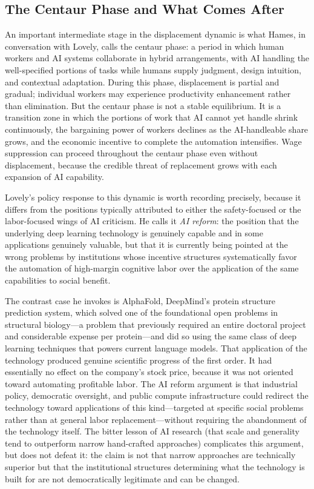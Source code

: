 \documentclass[12pt, a4paper]{article}
\theoremstyle{plain}
\theoremstyle{definition}
\theoremstyle{remark}
\begin{document}
\subsection{The Centaur Phase and What Comes After}

An important intermediate stage in the displacement dynamic is what Hames, in
conversation with Lovely, calls the centaur phase: a period in which human workers
and AI systems collaborate in hybrid arrangements, with AI handling the well-specified
portions of tasks while humans supply judgment, design intuition, and contextual
adaptation.
During this phase, displacement is partial and gradual; individual workers may
experience productivity enhancement rather than elimination.
But the centaur phase is not a stable equilibrium.
It is a transition zone in which the portions of work that AI cannot yet handle
shrink continuously, the bargaining power of workers declines as the AI-handleable
share grows, and the economic incentive to complete the automation intensifies.
Wage suppression can proceed throughout the centaur phase even without displacement,
because the credible threat of replacement grows with each expansion of AI capability.

Lovely's policy response to this dynamic is worth recording precisely, because it
differs from the positions typically attributed to either the safety-focused or the
labor-focused wings of AI criticism.
He calls it \emph{AI reform}: the position that the underlying deep learning
technology is genuinely capable and in some applications genuinely valuable, but
that it is currently being pointed at the wrong problems by institutions whose
incentive structures systematically favor the automation of high-margin cognitive
labor over the application of the same capabilities to social benefit.

The contrast case he invokes is AlphaFold, DeepMind's protein structure prediction
system, which solved one of the foundational open problems in structural biology---a
problem that previously required an entire doctoral project and considerable expense
per protein---and did so using the same class of deep learning techniques that powers
current language models.
That application of the technology produced genuine scientific progress of the first
order.
It had essentially no effect on the company's stock price, because it was not
oriented toward automating profitable labor.
The AI reform argument is that industrial policy, democratic oversight, and
public compute infrastructure could redirect the technology toward applications of
this kind---targeted at specific social problems rather than at general labor
replacement---without requiring the abandonment of the technology itself.
The bitter lesson of AI research (that scale and generality tend to outperform
narrow hand-crafted approaches) complicates this argument, but does not defeat it:
the claim is not that narrow approaches are technically superior but that the
institutional structures determining what the technology is built for are not
democratically legitimate and can be changed.
\end{document}
